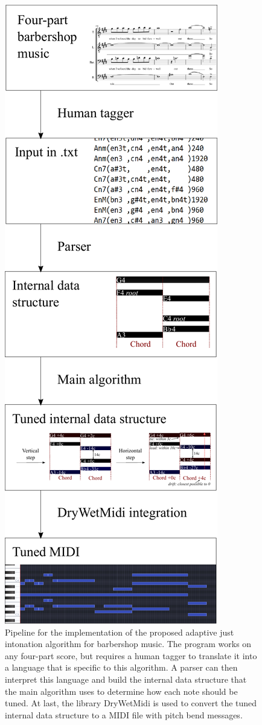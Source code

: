 \documentclass[a4paper]{article}
\begin{document}
\begin{figure}
	\centering
	\includegraphics[height=0.8\textheight]{Figures/pipeline.pdf}
	\caption{Pipeline for the implementation of the proposed adaptive just intonation algorithm for barbershop music. The program works on any four-part score, but requires a human tagger to translate it into a language that is specific to this algorithm. A parser can then interpret this language and build the internal data structure that the main algorithm uses to determine how each note should be tuned. At last, the library DryWetMidi is used to convert the tuned internal data structure to a MIDI file with pitch bend messages.}
	\label{fig:pipeline}
\end{figure}
\end{document}
